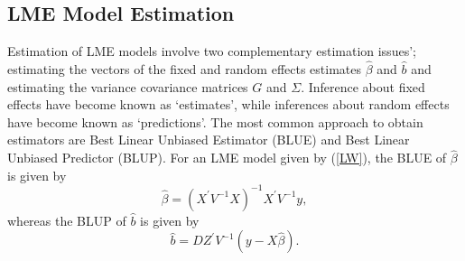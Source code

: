 \documentclass[12pt, a4paper]{report}
\theoremstyle{definition}
\theoremstyle{remark}
\begin{document}
\subsection{LME Model Estimation}
Estimation of LME models involve two complementary estimation issues'; estimating the vectors of the fixed and random effects estimates $\hat{\beta}$ and $\hat{b}$ and estimating the variance covariance matrices $G$ and $\Sigma$. Inference about fixed effects have become known as `estimates', while inferences about random effects have become known as `predictions'. The most common approach to obtain estimators are Best Linear Unbiased Estimator (BLUE) and Best Linear Unbiased Predictor (BLUP). For an LME model given by (\ref{LW}), the BLUE of $\hat{\beta}$ is given by
\begin{equation}
\hat{\beta} = (X^\prime V^{-1}X)^{-1}X^\prime V^{-1}y,
\end{equation}whereas the BLUP of $\hat{b}$ is given by
\begin{equation}
\hat{b} = DZ^{\prime} V^{-1} (y-X\hat{\beta}).
\end{equation}
\end{document}

